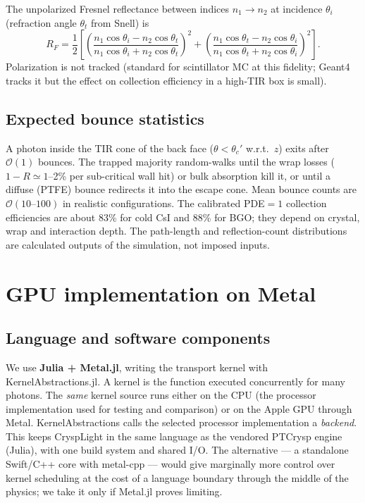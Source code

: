 \documentclass[11pt,a4paper]{article}
\begin{document}
The unpolarized Fresnel reflectance between indices $n_1 \to n_2$ at incidence $\theta_i$
(refraction angle $\theta_t$ from Snell) is
\begin{equation}
  R_F = \frac{1}{2}\left[
    \left(\frac{n_1\cos\theta_i - n_2\cos\theta_t}{n_1\cos\theta_i + n_2\cos\theta_t}\right)^2
    +
    \left(\frac{n_1\cos\theta_t - n_2\cos\theta_i}{n_1\cos\theta_t + n_2\cos\theta_i}\right)^2
  \right].
  \label{eq:fresnel}
\end{equation}
Polarization is not tracked (standard for scintillator MC at this fidelity; Geant4 tracks it
but the effect on collection efficiency in a high-TIR box is small).

\subsection{Expected bounce statistics}

A photon inside the TIR cone of the back face ($\theta < \theta_c'$ w.r.t.\ $z$) exits after
$\mathcal{O}(1)$ bounces. The trapped majority random-walks until the wrap losses
($1 - R \simeq 1$--2\% per sub-critical wall hit) or bulk absorption kill it, or until a
diffuse (PTFE) bounce redirects it into the escape cone. Mean bounce counts are
$\mathcal{O}(10\text{--}100)$ in realistic configurations. The calibrated PDE$=1$
collection efficiencies are about 83\% for cold CsI and 88\% for BGO; they depend on
crystal, wrap and interaction depth. The path-length and reflection-count distributions
are calculated outputs of the simulation, not imposed inputs.

\section{GPU implementation on Metal}
\label{sec:metal}

\subsection{Language and software components}

We use \textbf{Julia + Metal.jl}, writing the transport kernel with
KernelAbstractions.jl. A kernel is the function executed concurrently for many photons.
The \emph{same} kernel source runs either on the CPU (the processor implementation used
for testing and comparison) or on the Apple GPU through Metal. KernelAbstractions calls
the selected processor implementation a \emph{backend}. This keeps CryspLight in the same language
as the vendored PTCrysp engine (Julia), with one build system and shared I/O. The alternative
--- a standalone Swift/C++ core with metal-cpp --- would give marginally more control over
kernel scheduling at the cost of a language boundary through the middle of the physics; we
take it only if Metal.jl proves limiting.
\end{document}
